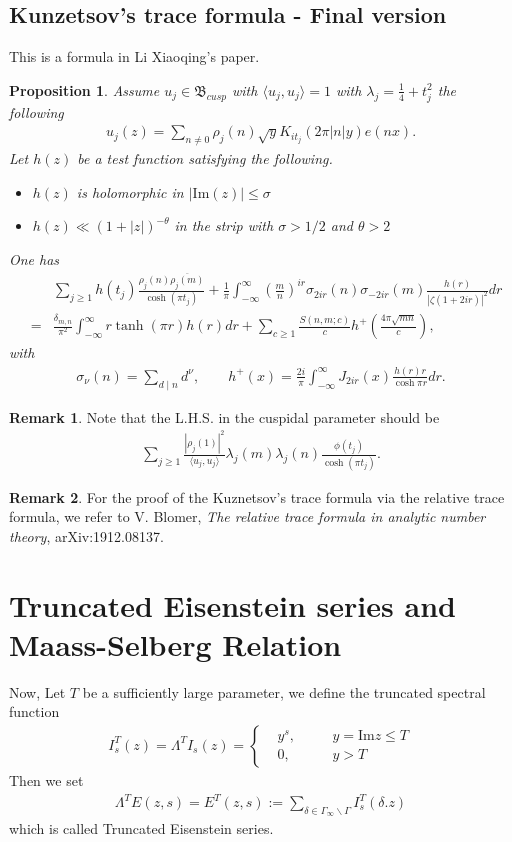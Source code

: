 \documentclass[11pt,reqno]{amsart}
\newcommand{\bna}{\begin{eqnarray*}}
\newcommand{\ena}{\end{eqnarray*}}
\def\im{{\mathrm{Im}}}
\newtheorem{prop}[lemma]{Proposition}
\theoremstyle{definition}
\newtheorem{remark}{Remark}
\newcommand{\bit}{\begin{itemize}}
\newcommand{\eit}{\end{itemize}}
\begin{document}
\subsection{Kunzetsov's trace formula - Final version}
This is a formula in Li Xiaoqing's paper.
\begin{prop}
Assume $u_j\in\mathfrak B_{cusp}$ with $\langle u_j,u_j\rangle=1$ with $\lambda_j=\frac{1}{4}+ t_j^2$ the following
\bna
u_j(z)=\sum_{n\neq 0}\rho_j(n)\sqrt{y}K_{it_j}(2\pi |n|y)e(nx).
\ena
Let $h(z)$ be a test function satisfying the following.
\bit
\item $h(z)$ is holomorphic in $|\im(z)|\leq\sigma$
\item $h(z)\ll (1+|z|)^{-\theta}$ in the strip with $\sigma>1/2$ and $\theta>2$
\eit
One has
\bna
&&\sum_{j\geq 1}h(t_j)\frac{\rho_j(n)\overline{\rho_j(m)}}{\cosh(\pi t_j)}
+\frac{1}{\pi}\int_{-\infty}^\infty\left(\frac{m}{n}\right)^{ir}
\sigma_{2ir}(n)\sigma_{-2ir}(m)\frac{h(r)}{|\zeta(1+2ir)|^2}dr\\
&=&\frac{\delta_{m,n}}{\pi^2}\int_{-\infty}^\infty
r\tanh(\pi r)h(r)dr + \sum_{c\geq 1}\frac{S(n,m;c)}{c}h^+\left(\frac{4\pi\sqrt{mn}}{c}\right),
\ena
with
\bna
\sigma_\nu(n)=\sum_{d\mid n}d^{\nu},\qquad
h^+(x)=\frac{2i}{\pi}\int_{-\infty}^\infty J_{2ir}(x)\frac{h(r)r}{\cosh \pi r}dr.
\ena
\end{prop}
\begin{remark}
Note that the L.H.S. in the cuspidal parameter should be
\bna
\sum_{j\geq 1}\frac{|\rho_{j}(1)|^2}{\langle u_j,u_j\rangle}
\lambda_j(m)\lambda_j(n)\frac{\phi(t_j)}{\cosh(\pi t_j)}.
\ena
\end{remark}

\begin{remark}
For the proof of the Kuznetsov's trace formula via the relative trace formula,
we refer to V. Blomer,
{\it The relative trace formula in analytic number theory},
arXiv:1912.08137.

\end{remark}

\section{Truncated Eisenstein series and Maass-Selberg Relation}
Now, Let $T$ be a sufficiently large parameter, we define the truncated spectral function
\bna
I_s^T(z)=\Lambda^TI_s(z)=\left\{
\begin{aligned}
&y^s,\quad&& y=\im z\leq T\\
&0,\quad&& y>T
\end{aligned}
\right.
\ena
Then we set
\bna
\Lambda^TE(z,s)=
E^T(z,s):=\sum_{\delta\in\Gamma_\infty\backslash\Gamma}I_s^T(\delta.z)
\ena
which is called Truncated Eisenstein series.
\end{document}

